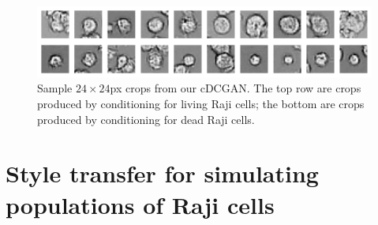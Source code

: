 \begin{figure}[h!]
\centering
\includegraphics[width=\textwidth]{img/feasibility_cdcgan_samples.pdf}
\caption{Sample $24\times 24$px crops from our cDCGAN. The top row are crops produced by conditioning for living Raji cells; the bottom are crops produced by conditioning for dead Raji cells.}
\label{fig:cdcgan_samples}
\end{figure}

\section{Style transfer for simulating populations of Raji cells}
\label{subsec:style_transfer_application}

